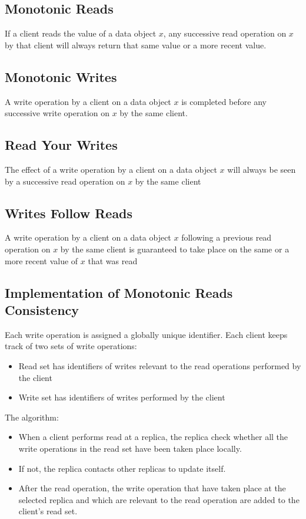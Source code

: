 \begin{multicols*}{2}
\subsection{Monotonic Reads}

\noindent If a client reads the value of a data object $x$, any successive read operation on $x$ by that client will always return that same value or a more recent value.

\subsection{Monotonic Writes}

\noindent A write operation by a client on a data object $x$ is completed before any successive write operation on $x$ by the same client.

\subsection{Read Your Writes}

\noindent The effect of a write operation by a client on a data object $x$ will always be seen by a successive read operation on $x$ by the same client

\subsection{Writes Follow Reads}

\noindent A write operation by a client on a data object $x$ following a previous read operation on $x$ by the same client is guaranteed to take place on the same or a more recent value of $x$ that was read

\subsection{Implementation of Monotonic Reads Consistency}

\noindent Each write operation is assigned a globally unique identifier. Each client keeps track of two sets of write operations:
\begin{itemize}
  \item Read set has identifiers of writes relevant to the read operations performed by the client
  \item Write set has identifiers of writes performed by the client
\end{itemize}

\noindent The algorithm:
\begin{itemize}
  \item When a client performs read at a replica, the replica check whether all the write operations in the read set have been taken place locally.
  \item If not, the replica contacts other replicas to update itself.
  \item After the read operation, the write operation that have taken place at the selected replica and which are relevant to the read operation are added to the client's read set.
\end{itemize}

\end{multicols*}
